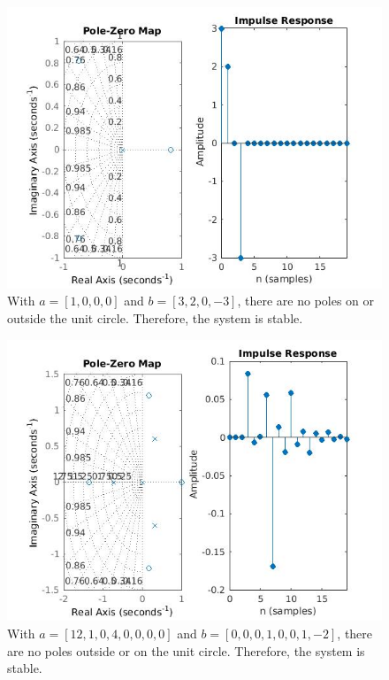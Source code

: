 \documentclass{article}
\begin{document}
\begin{figure}[H]
\includegraphics[scale = .5]{report5_2}
\\ With $a = [1,0,0,0]$ and $b = [3,2,0,-3]$, there are no poles on or outside the unit circle. Therefore, the system is stable.
\end{figure}

\begin{figure}[H]
\includegraphics[scale = .5]{report5_3}
\\ With $a = [12,1,0,4,0,0,0,0]$ and $b =[0,0,0,1,0,0,1,-2]$, there are no poles outside or on the unit circle. Therefore, the system is stable.
\end{figure}
\end{document}
